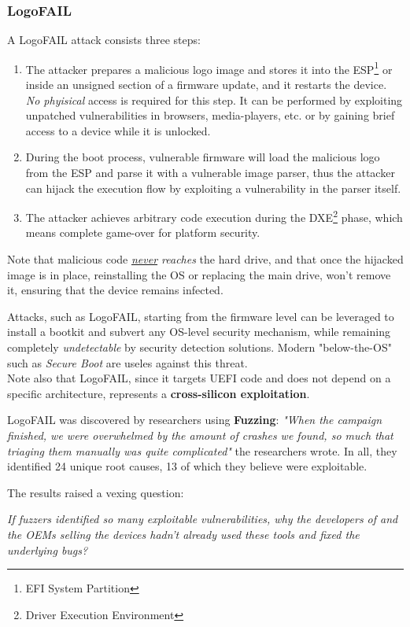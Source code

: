 \subsubsection{LogoFAIL}
A LogoFAIL attack consists three steps:
\begin{enumerate}
   \item The attacker prepares a malicious logo image and stores it into the ESP\footnote{EFI System Partition} or inside an unsigned section of a firmware update, and it restarts the device.\\
   \textit{No phyisical} access is required for this step.
   It can be performed by exploiting unpatched vulnerabilities in browsers, media-players, etc. or by gaining brief access to a device while it is unlocked.   
   \item During the boot process, vulnerable firmware will load the malicious logo from the ESP and parse it with a vulnerable image parser,
   thus the attacker can hijack the execution
   flow by exploiting a vulnerability in the parser itself.
   \item The attacker achieves arbitrary code execution during the DXE\footnote{Driver Execution Environment} phase, which means complete game-over for platform security.
\end{enumerate}

Note that malicious code \textit{\underline{never} reaches} the hard drive,
and that once the hijacked image is in place, reinstalling the OS or replacing the main drive, won't remove it,
ensuring that the device remains infected.

Attacks, such as LogoFAIL, starting from the firmware level can be leveraged to install
a bootkit and subvert any OS-level security mechanism, while
remaining completely \textit{undetectable} by security detection solutions.
Modern "below-the-OS" such as \textit{Secure Boot} are useles against this threat.\\
Note also that LogoFAIL, since it targets UEFI code and does not depend on a specific architecture, represents a \textbf{cross-silicon exploitation}.

\nl
LogoFAIL was discovered by researchers using \textbf{Fuzzing}:
\textit{"When the campaign finished, we were overwhelmed by the amount of crashes we
found, so much that triaging them manually was quite complicated"}
the researchers wrote. 
In all, they identified 24 unique root causes, 13 of which they believe were exploitable.

The results raised a vexing question:
\begin{center}
   \textit{If fuzzers identified so many exploitable vulnerabilities, why the developers of
   and the OEMs selling the devices hadn’t already used these tools and fixed
   the underlying bugs?}
\end{center}

